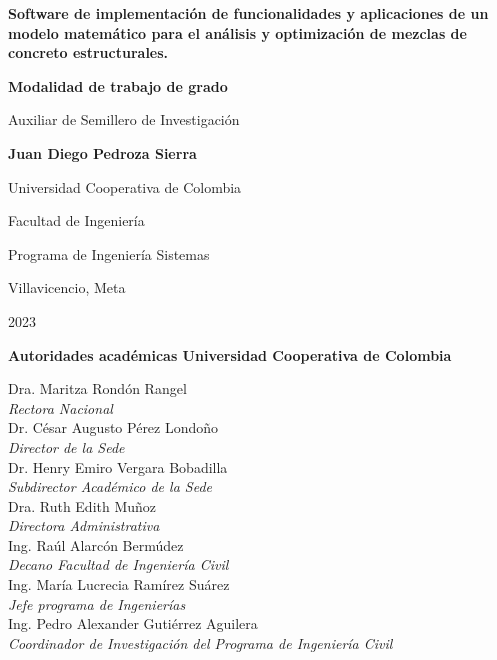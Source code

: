 \documentclass[12pt, letterpaper]{article}
\begin{document}
\begin{titlepage}
    \centering
    \vspace*{1cm}
    {\Huge \bfseries Software de implementación de funcionalidades y aplicaciones de un modelo matemático para el análisis y optimización de mezclas de concreto estructurales.\par}
    \vspace{2.5cm}
    {\Large \bfseries Modalidad de trabajo de grado\par}
    \vspace{0.5cm}
    {\Large Auxiliar de Semillero de Investigación\par}
    \vspace{2.5cm}
    {\Large \bfseries Juan Diego Pedroza Sierra\par}
    \vspace{4cm}
    {\Large Universidad Cooperativa de Colombia\par}
    {\Large Facultad de Ingeniería\par}
    {\Large Programa de Ingeniería Sistemas\par}
    {\Large Villavicencio, Meta\par}
    {\Large 2023\par}
\end{titlepage}



\newpage
\thispagestyle{empty}
\begin{center}
    \vspace*{2cm}
    {\large \bfseries Autoridades académicas Universidad Cooperativa de Colombia\par}
    \vspace{2cm}
\end{center}
\begin{flushleft}
    \large
    Dra. Maritza Rondón Rangel\\
    \textit{Rectora Nacional}\\[1cm]
    Dr. César Augusto Pérez Londoño\\
    \textit{Director de la Sede}\\[1cm]
    Dr. Henry Emiro Vergara Bobadilla\\
    \textit{Subdirector Académico de la Sede}\\[1cm]
    Dra. Ruth Edith Muñoz\\
    \textit{Directora Administrativa}\\[1cm]
    Ing. Raúl Alarcón Bermúdez\\
    \textit{Decano Facultad de Ingeniería Civil}\\[1cm]
    Ing. María Lucrecia Ramírez Suárez\\
    \textit{Jefe programa de Ingenierías}\\[1cm]
    Ing. Pedro Alexander Gutiérrez Aguilera\\
    \textit{Coordinador de Investigación del Programa de Ingeniería Civil}\\[1cm]
\end{flushleft}
\end{document}
